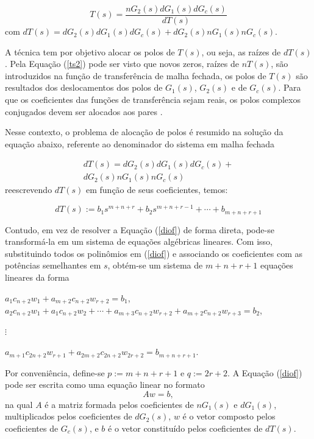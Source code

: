 \documentclass[journal,brazil,english]{IEEEtran}
\begin{document}
\begin{equation}\label{ts2}
T(s) = \frac{nG_2(s)dG_1(s)dG_c(s)}{dT(s)}
\end{equation}
com $dT(s) = dG_2(s)dG_1(s)dG_c(s)+dG_2(s)nG_1(s)nG_c(s)$.

A técnica tem por objetivo alocar os polos de $T(s)$, ou seja, as raízes de $dT(s)$. Pela Equação (\ref{ts2}) pode ser visto que novos zeros, raízes de $nT(s)$, são introduzidos na função de transferência de malha fechada, os polos de $T(s)$ são resultados dos deslocamentos dos polos de $G_1(s)$, $G_2(s)$ e de $G_c(s)$. Para que os coeficientes das funções de transferência sejam reais, os polos complexos conjugados devem ser alocados aos pares \cite{maitelli}.

Nesse contexto, o problema de alocação de polos é resumido na solução da equação abaixo, referente ao denominador do sistema em malha fechada

\begin{equation}\label{diof}
\begin{matrix}
dT(s) = dG_2(s)dG_1(s)dG_c(s)+\\dG_2(s)nG_1(s)nG_c(s)
\end{matrix}
\end{equation}
reescrevendo $dT(s)$ em função de seus coeficientes, temos:

\begin{equation}
dT(s) := b_1 s^{m+n+r} + b_2 s^{m+n+r-1} + \cdots + b_{m+n+r+1}
\end{equation}

Contudo, em vez de resolver a Equação (\ref{diof}) de forma direta, pode-se transformá-la em um sistema de equações algébricas lineares. Com isso, substituindo todos os polinômios em (\ref{diof}) e associando os coeficientes com as potências semelhantes em $s$, obtém-se um sistema de $m+n+r+1$ equações lineares da forma

\begin{center}
$a_1 c_{n+2} w_1 + a_{m+2} c_{n+2} w_{r+2} = b_1$,
$a_2 c_{n+2} w_1 + a_1 c_{n+2} w_2 + \cdots + a_{m+3} c_{n+2} w_{r+2} + a_{m+2} c_{n+2} w_{r+3} = b_2$,

$\vdots$

$a_{m+1} c_{2n+2} w_{r+1} + a_{2m+2} c_{2n+2} w_{2r+2} = b_{m+n+r+1}$.
\end{center}

Por conveniência, define-se $p := m+ n + r + 1$ e
$q := 2r + 2$. A Equação (\ref{diof}) pode ser escrita como uma equação linear no formato
\begin{equation}\label{silvester}
Aw=b,
\end{equation}
na qual $A$ é a matriz formada pelos coeficientes de $nG_1(s)$ e $dG_1(s)$, multiplicados pelos coeficientes de $dG_2(s)$, $w$ é o vetor composto pelos coeficientes de $G_c(s)$, e $b$ é o vetor constituído pelos coeficientes de $dT(s)$.
\end{document}
